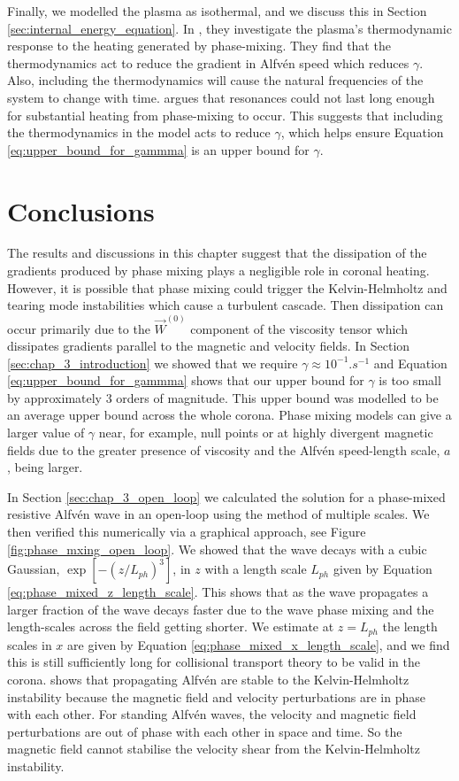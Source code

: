Finally, we modelled the plasma as isothermal, and we discuss this in Section \ref{sec:internal_energy_equation}. In \citet{Cargill2016}, they investigate the plasma's thermodynamic response to the heating generated by phase-mixing. They find that the thermodynamics act to reduce the gradient in Alfv\'en speed which reduces $\gamma$. Also, including the thermodynamics will cause the natural frequencies of the system to change with time. \citet{Arregui2015} argues that resonances could not last long enough for substantial heating from phase-mixing to occur. This suggests that including the thermodynamics in the model acts to reduce $\gamma$, which helps ensure Equation \eqref{eq:upper_bound_for_gammma} is an upper bound for $\gamma$.

\section{Conclusions}

The results and discussions in this chapter suggest that the dissipation of the gradients produced by phase mixing plays a negligible role in coronal heating. However, it is possible that phase mixing could trigger the Kelvin-Helmholtz and tearing mode instabilities which cause a turbulent cascade. Then dissipation can occur primarily due to the $\vec{W}^{(0)}$ component of the viscosity tensor which dissipates gradients parallel to the magnetic and velocity fields. In Section \ref{sec:chap_3_introduction} we showed that we require $\gamma\approx10^{-1}\si{.s^{-1}}$ and Equation \eqref{eq:upper_bound_for_gammma} shows that our upper bound for $\gamma$ is too small by approximately 3 orders of magnitude. This upper bound was modelled to be an average upper bound across the whole corona. Phase mixing models can give a larger value of $\gamma$ near, for example, null points or at highly divergent magnetic fields due to the greater presence of viscosity and the Alfv\'en speed-length scale, $a$, being larger.

In Section \ref{sec:chap_3_open_loop} we calculated the solution for a phase-mixed resistive Alfv\'en wave in an open-loop using the method of multiple scales. We then verified this numerically via a graphical approach, see Figure \ref{fig:phase_mxing_open_loop}. We showed that the wave decays with a cubic Gaussian, $\exp[-(z/L_{ph})^3]$, in $z$ with a length scale $L_{ph}$ given by Equation \eqref{eq:phase_mixed_z_length_scale}. This shows that as the wave propagates a larger fraction of the wave decays faster due to the wave phase mixing and the length-scales across the field getting shorter. We estimate at $z=L_{ph}$ the length scales in $x$ are given by Equation \eqref{eq:phase_mixed_x_length_scale}, and we find this is still sufficiently long for collisional transport theory to be valid in the corona. \citet{Heyvaerts1983} shows that propagating Alfv\'en are stable to the Kelvin-Helmholtz instability because the magnetic field and velocity perturbations are in phase with each other. For standing Alfv\'en waves, the velocity and magnetic field perturbations are out of phase with each other in space and time. So the magnetic field cannot stabilise the velocity shear from the Kelvin-Helmholtz instability.

